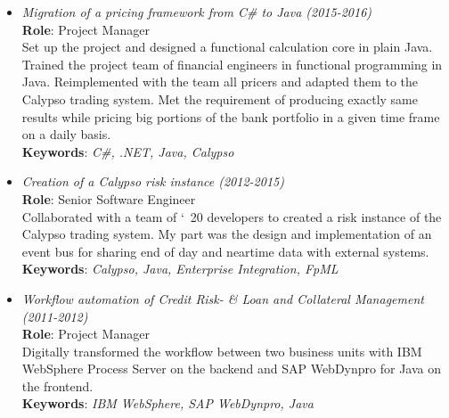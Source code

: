 \documentclass[10pt,a4paper,colorlinks=true]{moderncv}
\begin{document}
{\begin{itemize}
          Solved backend data synchronization challenges in a distributed, eventually persistent architecture with private data portions per bank.
          Created a frontend with React, TypeScript and Ant Design.
          Implemented the backend with Spring Boot and the Ethereum blockchain. \\[2pt]
          \textbf{Keywords}: \textit{Ethereum, React, TypeScript, Node.js, Spring Boot}
    \item \textit{Migration of a pricing framework from C\# to Java (2015-2016)} \\[2pt]
          \textbf{Role}: Project Manager \\[2pt]
          Set up the project and designed a functional calculation core in plain Java.
          Trained the project team of financial engineers in functional programming in Java.
          Reimplemented with the team all pricers and adapted them to the Calypso trading system.
          Met the requirement of producing exactly same results while pricing big portions of the bank portfolio in a given time frame on a daily basis. \\[2pt]
          \textbf{Keywords}: \textit{C\#, .NET, Java, Calypso}
    \item \textit{Creation of a Calypso risk instance (2012-2015)} \\[2pt]
          \textbf{Role}: Senior Software Engineer \\[2pt]
          Collaborated with a team of \char`~20 developers to created a risk instance of the Calypso trading system.
          My part was the design and implementation of an event bus for sharing end of day and neartime data with external systems. \\[2pt]
          \textbf{Keywords}: \textit{Calypso, Java, Enterprise Integration, FpML}
    \item \textit{Workflow automation of Credit Risk- \& Loan and Collateral Management (2011-2012)} \\[2pt]
          \textbf{Role}: Project Manager \\[2pt]
          Digitally transformed the workflow between two business units with IBM WebSphere Process Server on the backend
          and SAP WebDynpro for Java on the frontend. \\[2pt]
          \textbf{Keywords}: \textit{IBM WebSphere, SAP WebDynpro, Java}
  \end{itemize}
}
\end{document}
